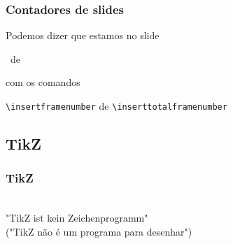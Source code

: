 \documentclass{beamer}
\newcommand{\kw}[1]{\textbackslash {\color{submerged}#1}}
\begin{document}
\begin{frame}
   \frametitle{Contadores de slides}
   Podemos dizer que estamos no slide 
   \begin{center}
      \insertframenumber\ de \inserttotalframenumber
   \end{center}
   com os comandos
   \begin{center}
      {\tt{\kw{insertframenumber}}} de {\tt{\kw{inserttotalframenumber}}}
   \end{center}
\end{frame}

\subsection{TikZ}

\begin{frame}
   \frametitle{TikZ}
   \begin{center}
      \begin{minipage}{8cm}
         \begin{alertblock}{}
            \begin{center}
               \mbox{}\\"TikZ ist kein Zeichenprogramm" \\("TikZ não é um programa para desenhar")\\\mbox{}
            \end{center}
         \end{alertblock}
      \end{minipage}
   \end{center}
\end{frame}
\end{document}
